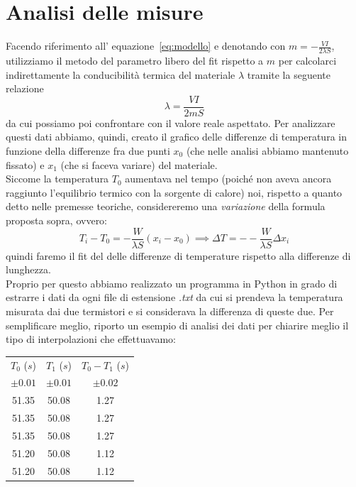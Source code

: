 \documentclass{article}
\begin{document}
\section{Analisi delle misure}
Facendo riferimento all' equazione~\ref{eq:modello} e denotando con $m = -\frac{VI}{2 \lambda S}$, utilizziamo il metodo del parametro libero del fit rispetto a $m$ per calcolarci indirettamente la conducibilità termica del materiale $\lambda$ tramite la seguente relazione
\begin{equation}
	\lambda = \frac{VI}{2mS} \label{eq:lambda}
\end{equation}
da cui possiamo poi confrontare con il valore reale aspettato.
Per analizzare questi dati abbiamo, quindi, creato il grafico delle differenze di temperatura in funzione della differenze fra due punti $x_0$ (che nelle analisi abbiamo mantenuto fissato) e $x_1$ (che si faceva variare) del materiale. \\
Siccome la temperatura $T_0$ aumentava nel tempo (poiché non aveva ancora raggiunto l'equilibrio termico con la sorgente di calore) noi, rispetto a quanto detto nelle premesse teoriche, considereremo una \emph{variazione} della formula proposta sopra, ovvero:
\begin{equation}
	T_i - T_0 = -\frac{W}{\lambda S}(x_i-x_0) \implies \Delta T = --\frac{W}{\lambda S}\Delta x_i
\end{equation}
quindi faremo il fit del delle differenze di temperature rispetto alla differenze di lunghezza. \\
Proprio per questo abbiamo realizzato un programma in Python in grado di estrarre i dati da ogni file di estensione \emph{.txt} da cui si prendeva la temperatura misurata dai due termistori e si considerava la differenza di queste due. Per semplificare meglio, riporto un esempio di analisi dei dati per chiarire meglio il tipo di interpolazioni che effettuavamo:

\clearpage
\begin{table}
	\centering	
	\begin{tabular}{c c c} \toprule
		$T_0$ ($s$) & $T_1$ ($s$) & $T_0 - T_1$ ($s$) \\
		$\pm 0.01$ & $\pm 0.01$   & $\pm 0.02$ \\ \toprule
		51.35 &  50.08 &  1.27 \\ \midrule
		51.35 &  50.08 &  1.27 \\ \midrule
		51.35 &  50.08 &  1.27 \\ \midrule
		51.20 &  50.08 &  1.12 \\ \midrule
		51.20 &  50.08 &  1.12 \\ \bottomrule
	\end{tabular}
\end{table}
\end{document}
